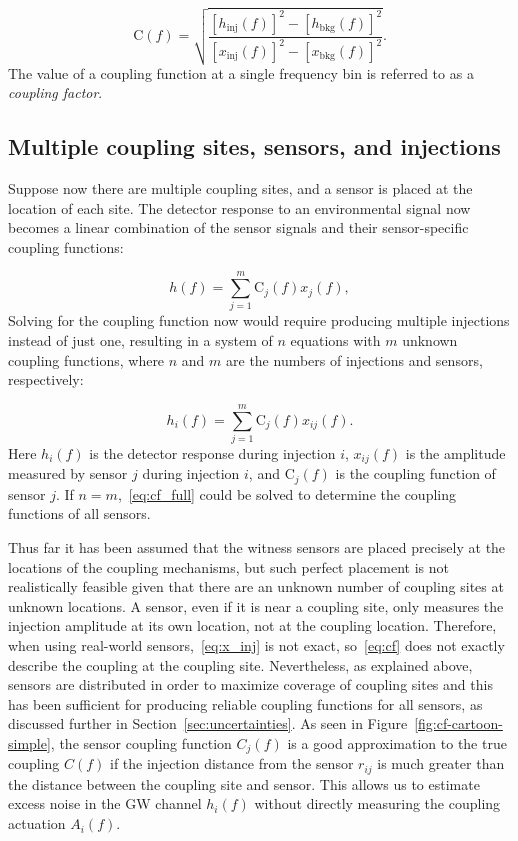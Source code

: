 \begin{equation}\label{eq:cf}
	\mathrm{C}(f) = \sqrt{\frac{[h_{\textrm{inj}}(f)]^2 - [h_{\textrm{bkg}}(f)]^2}{[x_{\textrm{inj}}(f)]^2 - [x_{\textrm{bkg}}(f)]^2}}.
\end{equation}
The value of a coupling function at a single frequency bin is referred to as a \textit{coupling factor}.

\subsection{Multiple coupling sites, sensors, and injections}

Suppose now there are multiple coupling sites, and a sensor is placed at the location of each site.
The detector response to an environmental signal now becomes a linear combination of the sensor signals and their sensor-specific coupling functions:

\begin{equation}\label{eq:cf_model_expanded}
	h(f) = \sum_{j=1}^{m} \mathrm{C}_j(f) x_{j}(f),
\end{equation}
Solving for the coupling function now would require producing multiple injections instead of just one, resulting in a system of $n$ equations with $m$ unknown coupling functions, where $n$ and $m$ are the numbers of injections and sensors, respectively:

\begin{equation}\label{eq:cf_full}
	h_i(f) = \sum_{j=1}^{m} \mathrm{C}_j(f) x_{ij}(f).
\end{equation}
Here $h_i(f)$ is the detector response during injection $i$, $x_{ij}(f)$ is the amplitude measured by sensor $j$ during injection $i$, and $\mathrm{C}_j(f)$ is the coupling function of sensor $j$.
If $n = m$,~\cref{eq:cf_full} could be solved to determine the coupling functions of all sensors.

Thus far it has been assumed that the witness sensors are placed precisely at the locations of the coupling mechanisms, but such perfect placement is not realistically feasible given that there are an unknown number of coupling sites at unknown locations.
A sensor, even if it is near a coupling site, only measures the injection amplitude at its own location, not at the coupling location.
Therefore, when using real-world sensors,~\cref{eq:x_inj} is not exact, so~\cref{eq:cf} does not exactly describe the coupling at the coupling site.
Nevertheless, as explained above, sensors are distributed in order to maximize coverage of coupling sites and this has been sufficient for producing reliable coupling functions for all sensors, as discussed further in Section~\ref{sec:uncertainties}.
As seen in Figure~\ref{fig:cf-cartoon-simple}, the sensor coupling function $C_j(f)$ is a good approximation to the true coupling $C(f)$ if the injection distance from the sensor $r_{ij}$ is much greater than the distance between the coupling site and sensor.
This allows us to estimate excess noise in the \ac{GW} channel $h_i(f)$ without directly measuring the coupling actuation $A_i(f)$.

